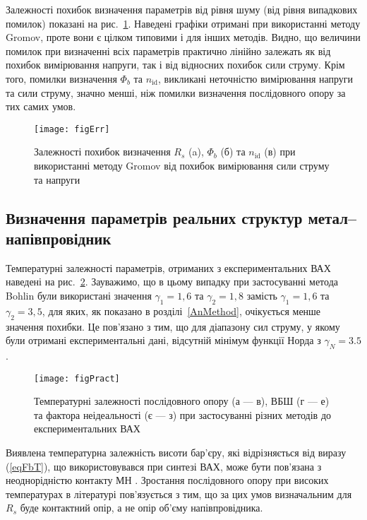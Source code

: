Залежності похибок визначення параметрів від рівня шуму (від рівня випадкових помилок) показані на рис.~\ref{figErr}.
Наведені графіки отримані при використанні методу Gromov, проте вони є цілком типовими і для інших методів.
Видно, що величини помилок при визначенні всіх параметрів практично лінійно залежать як від похибок вимірювання напруги, так і від відносних похибок сили струму.
Крім того, помилки визначення $\Phi_b$ та $n_\mathrm{id}$, викликані неточністю вимірювання напруги та сили струму, значно менші, ніж помилки визначення послідовного опору за тих самих умов.


\begin{figure}
\texttt{[image: figErr]}%
\caption{\label{figErr}
Залежності похибок визначення $R_s$ (a), $\Phi_b$ (б) та $n_\mathrm{id}$ (в) при використанні методу Gromov  від похибок вимірювання сили струму та напруги
}
\end{figure}


\subsection{Визначення параметрів реальних структур метал--напівпровідник}

Температурні залежності параметрів, отриманих з експериментальних ВАХ наведені на рис.~\ref{figPract}.
Зауважимо, що в цьому випадку при застосуванні метода Bohlin були використані значення $\gamma_1=1,6$ та $\gamma_2=1,8$ замість  $\gamma_1=1,6$ та $\gamma_2=3,5$, для яких, як показано в розділі~\ref{AnMethod}, очікується менше значення похибки.
Це пов'язано з тим, що для діапазону сил струму, у якому були отримані експериментальні дані, відсутній мінімум функції Норда з $\gamma_N=3.5$.



\begin{figure}
\center
\texttt{[image: figPract]}%
\caption{\label{figPract}
Температурні залежності послідовного опору (а --- в), ВБШ (г --- е) та фактора неідеальності (є --- з) при
застосуванні різних методів до експериментальних ВАХ
}
\end{figure}

Виявлена температурна залежність висоти бар'єру, які відрізняється від виразу (\ref{eqFbT}), що використовувався при синтезі ВАХ, може бути пов'язана з неоднорідністю контакту МН \cite{Tung:MSE,Olikh:2013IEEE}.
Зростання послідовного опору при високих температурах в літературі \cite{Rs:Dokme} пов'язується з тим, що за цих умов визначальним для $R_s$ буде контактний опір, а не опір об'єму напівпровідника.

